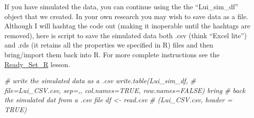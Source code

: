 \documentclass[
  11pt,
]{book}
\newenvironment{Shaded}{\begin{snugshade}}{\end{snugshade}}
\newcommand{\CommentTok}[1]{\textcolor[rgb]{0.56,0.35,0.01}{\textit{#1}}}
\newcommand{\DecValTok}[1]{\textcolor[rgb]{0.00,0.00,0.81}{#1}}
\newcommand{\FunctionTok}[1]{\textcolor[rgb]{0.00,0.00,0.00}{#1}}
\newcommand{\NormalTok}[1]{#1}
\newcommand{\OtherTok}[1]{\textcolor[rgb]{0.56,0.35,0.01}{#1}}
\newcommand{\SpecialCharTok}[1]{\textcolor[rgb]{0.00,0.00,0.00}{#1}}
\newcommand{\StringTok}[1]{\textcolor[rgb]{0.31,0.60,0.02}{#1}}
\begin{document}
\begin{Shaded}
\end{Shaded}

If you have simulated the data, you can continue using the the ``Lui\_sim\_df'' object that we created. In your own research you may wish to save data as a file. Although I will hashtag the code out (making it inoperable until the hashtags are removed), here is script to save the simulated data both .csv (think ``Excel lite'') and .rds (it retains all the properties we specified in R) files and then bring/import them back into R. For more complete instructions see the \protect\hyperlink{Ready}{Ready\_Set\_R} lesson.

\begin{Shaded}
\begin{Highlighting}[]
\CommentTok{\# write the simulated data as a .csv write.table(Lui\_sim\_df,}
\CommentTok{\# file=\textquotesingle{}Lui\_CSV.csv\textquotesingle{}, sep=\textquotesingle{},\textquotesingle{}, col.names=TRUE, row.names=FALSE) bring}
\CommentTok{\# back the simulated dat from a .csv file df \textless{}{-} read.csv}
\CommentTok{\# (\textquotesingle{}Lui\_CSV.csv\textquotesingle{}, header = TRUE)}
\end{Highlighting}
\end{Shaded}
\end{document}
